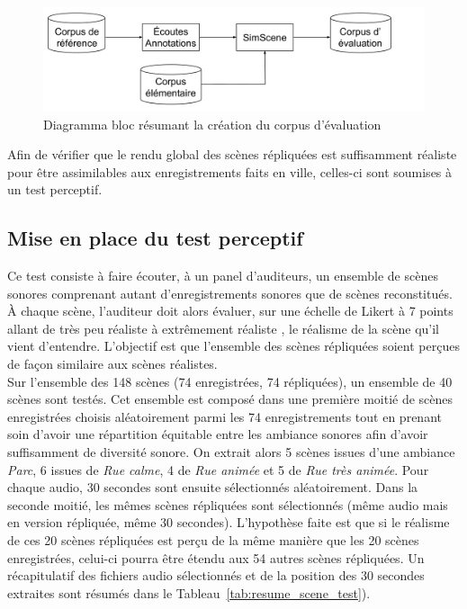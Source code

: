 \begin{figure}[t]
\centering
\includegraphics[width=.7\textwidth]{./figures/autres/bloc_diagram_annotation.pdf}
\caption{Diagramma bloc résumant la création du corpus d'évaluation}
\label{fig:bloc_diagram_annotation}
\end{figure}


Afin de vérifier que le rendu global des scènes répliquées est suffisamment réaliste pour être assimilables aux enregistrements faits en ville, celles-ci sont soumises à un test perceptif.

\subsection{Mise en place du test perceptif}\label{sec:test}

Ce test consiste à faire écouter, à un panel d'auditeurs, un ensemble de scènes sonores comprenant autant d'enregistrements sonores que de scènes reconstitués. À chaque scène, l'auditeur doit alors évaluer, sur une échelle de Likert à 7 points allant de \og très peu réaliste \fg{} à \og extrêmement réaliste \fg{}, le réalisme de la scène qu'il vient d'entendre. L'objectif est que l'ensemble des scènes répliquées soient perçues de façon similaire aux scènes réalistes.\\

Sur l'ensemble des 148 scènes (74 enregistrées, 74 répliquées), un ensemble de 40 scènes sont testés. 
Cet ensemble est composé dans une première moitié de scènes enregistrées choisis aléatoirement parmi les 74 enregistrements tout en prenant soin d'avoir une répartition équitable entre les ambiance sonores afin d'avoir suffisamment de diversité sonore. On extrait alors 5 scènes issues d'une ambiance \textit{Parc}, 6 issues de \textit{Rue calme}, 4 de \textit{Rue animée} et 5 de \textit{Rue très animée}. Pour chaque audio, 30 secondes sont ensuite sélectionnés aléatoirement.
Dans la seconde moitié, les mêmes scènes répliquées sont sélectionnés (même audio mais en version répliquée, même 30 secondes). L'hypothèse faite est que si le réalisme de ces 20 scènes répliquées est perçu de la même manière que les 20 scènes enregistrées, celui-ci pourra être étendu aux 54 autres scènes répliquées. Un récapitulatif des fichiers audio sélectionnés et de la position des 30 secondes extraites sont résumés dans le Tableau~\ref{tab:resume_scene_test}).\\

